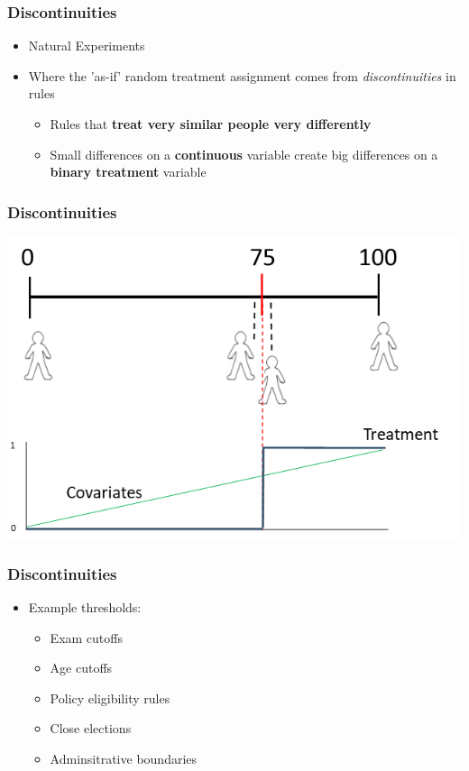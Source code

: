 \documentclass[xcolor=x11names,compress]{beamer}\usepackage[]{graphicx}\usepackage[]{color}
\renewcommand{\(}{\begin{columns}}
\renewcommand{\)}{\end{columns}}
\newcommand{\<}[1]{\begin{column}{#1}}
\renewcommand{\>}{\end{column}}
\begin{document}
\begin{frame}
\frametitle{Discontinuities}
\begin{itemize}
\item Natural Experiments
\pause
\item Where the 'as-if' random treatment assignment comes from \textit{discontinuities} in rules
\pause
\begin{itemize}
\item Rules that \textbf{treat very similar people very differently}
\pause
\item Small differences on a \textbf{continuous} variable create big differences on a \textbf{binary treatment} variable
\end{itemize}
\end{itemize}
\end{frame}

\begin{frame}
\frametitle{Discontinuities}
\begin{center}
\includegraphics[scale=0.55]{Scale.png}
\end{center}
\end{frame}


\begin{frame}
\frametitle{Discontinuities}
\begin{itemize}
\item Example thresholds:
\begin{itemize}
\item Exam cutoffs
\item Age cutoffs
\item Policy eligibility rules
\item Close elections
\item Adminsitrative boundaries
\end{itemize}
\end{itemize}
\end{frame}
\end{document}

